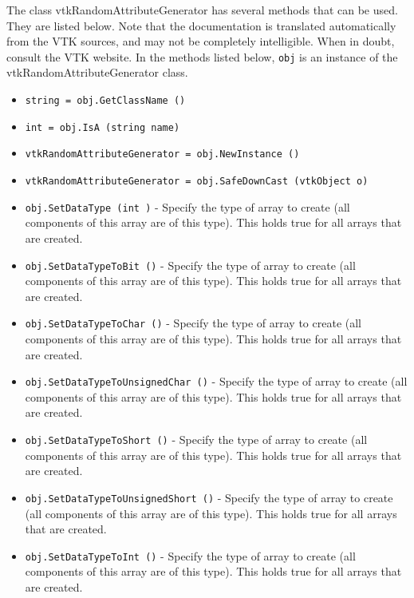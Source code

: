 The class vtkRandomAttributeGenerator has several methods that can be used.
  They are listed below.
Note that the documentation is translated automatically from the VTK sources,
and may not be completely intelligible.  When in doubt, consult the VTK website.
In the methods listed below, \verb|obj| is an instance of the vtkRandomAttributeGenerator class.
\begin{itemize}
\item  \verb|string = obj.GetClassName ()|

\item  \verb|int = obj.IsA (string name)|

\item  \verb|vtkRandomAttributeGenerator = obj.NewInstance ()|

\item  \verb|vtkRandomAttributeGenerator = obj.SafeDownCast (vtkObject o)|

\item  \verb|obj.SetDataType (int )| -  Specify the type of array to create (all components of this array are of this
 type). This holds true for all arrays that are created.

\item  \verb|obj.SetDataTypeToBit ()| -  Specify the type of array to create (all components of this array are of this
 type). This holds true for all arrays that are created.

\item  \verb|obj.SetDataTypeToChar ()| -  Specify the type of array to create (all components of this array are of this
 type). This holds true for all arrays that are created.

\item  \verb|obj.SetDataTypeToUnsignedChar ()| -  Specify the type of array to create (all components of this array are of this
 type). This holds true for all arrays that are created.

\item  \verb|obj.SetDataTypeToShort ()| -  Specify the type of array to create (all components of this array are of this
 type). This holds true for all arrays that are created.

\item  \verb|obj.SetDataTypeToUnsignedShort ()| -  Specify the type of array to create (all components of this array are of this
 type). This holds true for all arrays that are created.

\item  \verb|obj.SetDataTypeToInt ()| -  Specify the type of array to create (all components of this array are of this
 type). This holds true for all arrays that are created.


\end{itemize}

